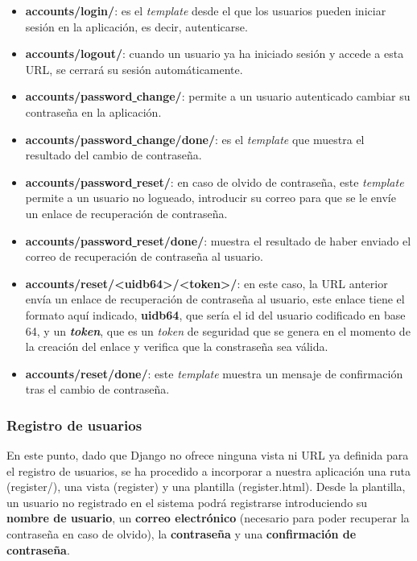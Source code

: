     \begin{itemize}
        \item \textbf{accounts/login/}: es el \textit{template} desde el que los usuarios
        pueden iniciar sesión en la aplicación, es decir, autenticarse.
        \item \textbf{accounts/logout/}: cuando un usuario ya ha iniciado sesión y accede
        a esta URL, se cerrará su sesión automáticamente.
        \item \textbf{accounts/password\underline{ }change/}: permite a un usuario
        autenticado cambiar su contraseña en la aplicación.
        \item \textbf{accounts/password\underline{ }change/done/}: es el \textit{template}
        que muestra el resultado del cambio de contraseña.
        \item \textbf{accounts/password\underline{ }reset/}: en caso de olvido de contraseña,
        este \textit{template} permite a un usuario no logueado, introducir su correo para
        que se le envíe un enlace de recuperación de contraseña.
        \item \textbf{accounts/password\underline{ }reset/done/}: muestra el resultado de
        haber enviado el correo de recuperación de contraseña al usuario.
        \item \textbf{accounts/reset/<uidb64>/<token>/}: en este caso, la URL anterior
        envía un enlace de recuperación de contraseña al usuario, este enlace tiene el
        formato aquí indicado, \textbf{uidb64}, que sería el id del usuario codificado
        en base 64, y un \textbf{\textit{token}}, que es un \textit{token} de seguridad que
        se genera en el momento de la creación del enlace y verifica que la constraseña sea
        válida.
        \item \textbf{accounts/reset/done/}: este \textit{template} muestra un mensaje de
        confirmación tras el cambio de contraseña.
    \end{itemize}

\subsubsection{Registro de usuarios}
En este punto, dado que Django no ofrece ninguna vista ni URL ya definida para el registro
de usuarios, se ha procedido a incorporar a nuestra aplicación una ruta (register/),
una vista (register) y una plantilla (register.html). Desde la plantilla, un usuario no
registrado en el sistema podrá registrarse introduciendo su \textbf{nombre de usuario}, un
\textbf{correo electrónico} (necesario para poder recuperar la contraseña en caso de
olvido), la \textbf{contraseña} y una \textbf{confirmación de contraseña}.\\

